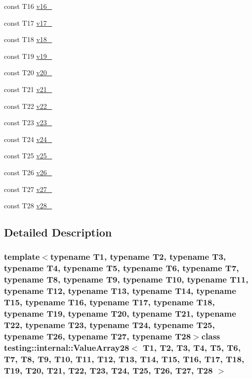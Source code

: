 \begin{DoxyCompactItemize}
\item 
const \-T16 \hyperlink{classtesting_1_1internal_1_1ValueArray28_a8b2b80d31925c1583c3e694d2bf235c5}{v16\-\_\-}
\item 
const \-T17 \hyperlink{classtesting_1_1internal_1_1ValueArray28_a9f59ea9e6f3642f77227dd1f7882d649}{v17\-\_\-}
\item 
const \-T18 \hyperlink{classtesting_1_1internal_1_1ValueArray28_ad07972ee98135c8deb090fc891a04e3e}{v18\-\_\-}
\item 
const \-T19 \hyperlink{classtesting_1_1internal_1_1ValueArray28_a3ad77b5b43c14332dabc9d47c8907e7f}{v19\-\_\-}
\item 
const \-T20 \hyperlink{classtesting_1_1internal_1_1ValueArray28_adb43992f7b5f5f07e0187003b8c9c872}{v20\-\_\-}
\item 
const \-T21 \hyperlink{classtesting_1_1internal_1_1ValueArray28_a80089b2eaa99efb5d3559378fbdac426}{v21\-\_\-}
\item 
const \-T22 \hyperlink{classtesting_1_1internal_1_1ValueArray28_aeec4c711a4f7cf166e6a2646aa7d0bc7}{v22\-\_\-}
\item 
const \-T23 \hyperlink{classtesting_1_1internal_1_1ValueArray28_a7f672a4a694f749a8b6119bff7705a66}{v23\-\_\-}
\item 
const \-T24 \hyperlink{classtesting_1_1internal_1_1ValueArray28_a6c10a180ac97815f7d3f4522507e91ca}{v24\-\_\-}
\item 
const \-T25 \hyperlink{classtesting_1_1internal_1_1ValueArray28_a26cfe8143447970e30441924be04bf08}{v25\-\_\-}
\item 
const \-T26 \hyperlink{classtesting_1_1internal_1_1ValueArray28_a26c3ac1aaf85c25e014a5001cfecb4c5}{v26\-\_\-}
\item 
const \-T27 \hyperlink{classtesting_1_1internal_1_1ValueArray28_aee0cd82b89da8c22b3d49e9beea5f0a4}{v27\-\_\-}
\item 
const \-T28 \hyperlink{classtesting_1_1internal_1_1ValueArray28_a70009fbc6bb95bda68add912f5116104}{v28\-\_\-}
\end{DoxyCompactItemize}


\subsection{\-Detailed \-Description}
\subsubsection*{template$<$typename T1, typename T2, typename T3, typename T4, typename T5, typename T6, typename T7, typename T8, typename T9, typename T10, typename T11, typename T12, typename T13, typename T14, typename T15, typename T16, typename T17, typename T18, typename T19, typename T20, typename T21, typename T22, typename T23, typename T24, typename T25, typename T26, typename T27, typename T28$>$class testing\-::internal\-::\-Value\-Array28$<$ T1, T2, T3, T4, T5, T6, T7, T8, T9, T10, T11, T12, T13, T14, T15, T16, T17, T18, T19, T20, T21, T22, T23, T24, T25, T26, T27, T28 $>$}



